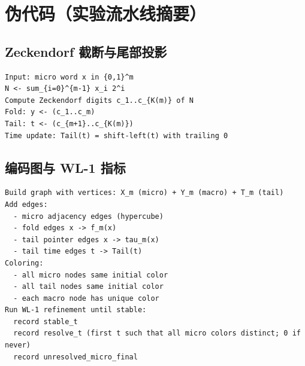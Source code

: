 \section{伪代码（实验流水线摘要）}

\subsection{Zeckendorf 截断与尾部投影}

\begin{verbatim}
Input: micro word x in {0,1}^m
N <- sum_{i=0}^{m-1} x_i 2^i
Compute Zeckendorf digits c_1..c_{K(m)} of N
Fold: y <- (c_1..c_m)
Tail: t <- (c_{m+1}..c_{K(m)})
Time update: Tail(t) = shift-left(t) with trailing 0
\end{verbatim}

\subsection{编码图与 WL-1 指标}

\begin{verbatim}
Build graph with vertices: X_m (micro) + Y_m (macro) + T_m (tail)
Add edges:
  - micro adjacency edges (hypercube)
  - fold edges x -> f_m(x)
  - tail pointer edges x -> tau_m(x)
  - tail time edges t -> Tail(t)
Coloring:
  - all micro nodes same initial color
  - all tail nodes same initial color
  - each macro node has unique color
Run WL-1 refinement until stable:
  record stable_t
  record resolve_t (first t such that all micro colors distinct; 0 if never)
  record unresolved_micro_final
\end{verbatim}

